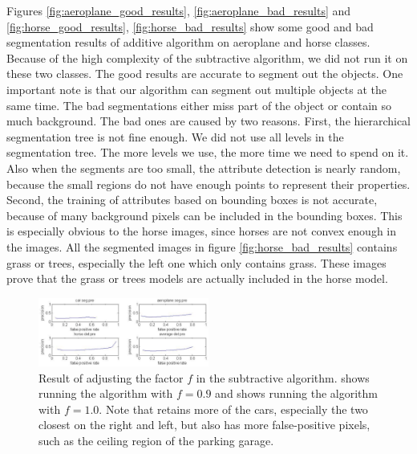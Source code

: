 \documentclass[10pt,twocolumn,letterpaper]{article}
\begin{document}
Figures \ref{fig:aeroplane_good_results}, \ref{fig:aeroplane_bad_results} and 
\ref{fig:horse_good_results}, \ref{fig:horse_bad_results} show some good and bad 
segmentation results of additive algorithm on aeroplane and horse classes. Because of the
high complexity of the subtractive algorithm, we did not run it on these two classes. The good 
results are accurate to segment out the objects. One important note is that our algorithm can segment out
multiple objects at the same time. The bad segmentations either miss 
part of the object or contain so much background. The bad ones are caused 
by two reasons. First, the hierarchical segmentation tree is not fine enough. We did not use all 
levels in the segmentation tree. The more levels we use, the more time we need to spend on it. 
Also when the segments are too small, the attribute detection is nearly random, because the small regions 
do not have enough points to represent their properties. Second, the training of attributes based on
bounding boxes is not accurate, because of many background pixels can be included in the bounding boxes. 
This is especially obvious to the horse images, since horses are not convex enough in the images. 
All the segmented images in figure \ref{fig:horse_bad_results} contains grass or trees, especially the 
left one which only contains grass. These images prove that the grass or trees models are actually
included in the horse model.\\  


\begin{figure}
\centering
\includegraphics[width=0.5\textwidth]{figures/add_res/roc_seg.png.eps}
\caption{Result of adjusting the factor $f$ in the subtractive
algorithm.  shows running the algorithm with $f=0.9$
and  shows running the algorithm with $f=1.0$.  Note
that  retains more of the cars, especially the two
closest on the right and left, but also has more false-positive
pixels, such as the ceiling region of the parking garage.}
\label{fig:roc_seg}
\end{figure}
\end{document}

